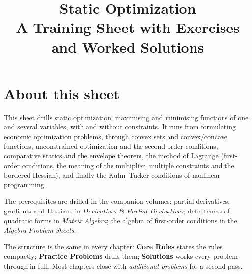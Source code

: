 \documentclass[10pt,oneside]{book}
\title{\Huge Static Optimization\\[0.4em]
  \large A Training Sheet with Exercises and Worked Solutions}
\author{}
\date{}
\begin{document}
\frontmatter
\maketitle

\chapter*{About this sheet}

This sheet drills static optimization: maximising and minimising functions
of one and several variables, with and without constraints. It runs from
formulating economic optimization problems, through convex sets and
convex/concave functions, unconstrained optimization and the second-order
conditions, comparative statics and the envelope theorem, the method of
Lagrange (first-order conditions, the meaning of the multiplier, multiple
constraints and the bordered Hessian), and finally the Kuhn--Tucker
conditions of nonlinear programming.

The prerequisites are drilled in the companion volumes: partial derivatives,
gradients and Hessians in \emph{Derivatives \& Partial Derivatives};
definiteness of quadratic forms in \emph{Matrix Algebra}; the algebra of
first-order conditions in the \emph{Algebra Problem Sheets}.

The structure is the same in every chapter: \textbf{Core Rules} states the
rules compactly; \textbf{Practice Problems} drills them; \textbf{Solutions}
works every problem through in full. Most chapters close with
\emph{additional problems} for a second pass.

\tableofcontents

\mainmatter










\end{document}
